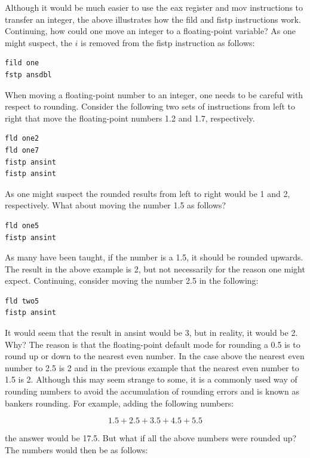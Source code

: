 \documentclass[10pt]{book}
\begin{document}
Although it would be much easier to use the eax register and mov instructions to transfer an integer, the above illustrates how the fild and fistp instructions work. Continuing, how could one move an integer to a floating-point variable? As one might suspect, the $i$ is removed from the fistp instruction as follows:

\begin{verbatim}
fild one
fstp ansdbl
\end{verbatim}

When moving a floating-point number to an integer, one needs to be careful with respect to rounding. Consider the following two sets of instructions from left to right that move the floating-point numbers 1.2 and 1.7, respectively.
\begin{verbatim}
fld one2
fld one7
fistp ansint
fistp ansint
\end{verbatim}

As one might suspect the rounded results from left to right would be 1 and 2, respectively. What about moving the number 1.5 as follows?

\begin{verbatim}
fld one5
fistp ansint
\end{verbatim}

As many have been taught, if the number is a 1.5, it should be rounded upwards. The result in the above example is 2, but not necessarily for the reason one might expect. Continuing, consider moving the number 2.5 in the following:

\begin{verbatim}
fld two5
fistp ansint
\end{verbatim}

It would seem that the result in ansint would be 3, but in reality, it would be 2. Why? The reason is that the floating-point default mode for rounding a 0.5 is to round up or down to the nearest even number. In the case above the nearest even number to 2.5 is 2 and in the previous example that the nearest even number to 1.5 is 2. Although this may seem strange to some, it is a commonly used way of rounding numbers to avoid the accumulation of rounding errors and is known as bankers rounding. For example, adding the following numbers:

$$
1.5 + 2.5 + 3.5 + 4.5 + 5.5
$$

the answer would be 17.5. But what if all the above numbers were rounded up? The numbers would then be as follows:
\end{document}
